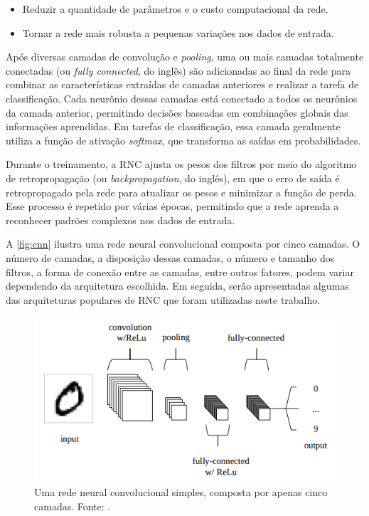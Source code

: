 \begin{itemize}
    \item Reduzir a quantidade de parâmetros e o custo computacional da rede.
    \item Tornar a rede mais robusta a pequenas variações nos dados de entrada.
\end{itemize}

Após diversas camadas de convolução e \textit{pooling}, uma ou mais camadas totalmente conectadas (ou \textit{fully connected}, do inglês) são adicionadas ao final da rede para combinar as características extraídas de camadas anteriores e realizar a tarefa de classificação. Cada neurônio dessas camadas está conectado a todos os neurônios da camada anterior, permitindo decisões baseadas em combinações globais das informações aprendidas. Em tarefas de classificação, essa camada geralmente utiliza a função de ativação \textit{softmax}, que transforma as saídas em probabilidades.

Durante o treinamento, a RNC ajusta os pesos dos filtros por meio do algoritmo de retropropagação (ou \textit{backpropagation}, do inglês), em que o erro de saída é retropropagado pela rede para atualizar os pesos e minimizar a função de perda. Esse processo é repetido por várias épocas, permitindo que a rede aprenda a reconhecer padrões complexos nos dados de entrada.

A \autoref{fig:cnn} ilustra uma rede neural convolucional composta por cinco camadas. O número de camadas, a disposição dessas camadas, o número e tamanho dos filtros, a forma de conexão entre as camadas, entre outros fatores, podem variar dependendo da arquitetura escolhida. Em seguida, serão apresentadas algumas das arquiteturas populares de RNC que foram utilizadas neste trabalho.

\begin{figure}[!htbp]
    \centering
    \includegraphics[width=0.7\linewidth]{figs/convolution-neural-network.png}
    \caption{Uma rede neural convolucional simples, composta por apenas cinco camadas. Fonte: .}
    \label{fig:cnn}
\end{figure}

